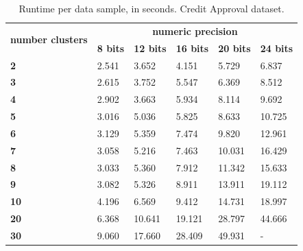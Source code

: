 \begin{table}[H]
\centering
\caption{Runtime per data sample, in seconds. Credit Approval dataset.}
\label{table:runtimeKMCA}
\begin{tabular}{|l|l|l|l|l|l|}
\hline
\multirow{2}{*}{\textbf{number clusters}} & \multicolumn{5}{c|}{\textbf{numeric precision}}                                              \\ \cline{2-6}
                                          & \textbf{8 bits} & \textbf{12 bits} & \textbf{16 bits} & \textbf{20 bits} & \textbf{24 bits} \\ \hline
\textbf{2}                                & 2.541           & 3.652            & 4.151            & 5.729            & 6.837            \\ \hline
\textbf{3}                                & 2.615           & 3.752            & 5.547            & 6.369            & 8.512            \\ \hline
\textbf{4}                                & 2.902           & 3.663            & 5.934            & 8.114            & 9.692            \\ \hline
\textbf{5}                                & 3.016           & 5.036            & 5.825            & 8.633            & 10.725           \\ \hline
\textbf{6}                                & 3.129           & 5.359            & 7.474            & 9.820            & 12.961           \\ \hline
\textbf{7}                                & 3.058           & 5.216            & 7.463            & 10.031           & 16.429           \\ \hline
\textbf{8}                                & 3.033           & 5.360            & 7.912            & 11.342           & 15.633           \\ \hline
\textbf{9}                                & 3.082           & 5.326            & 8.911            & 13.911           & 19.112           \\ \hline
\textbf{10}                               & 4.196           & 6.569            & 9.412            & 14.731           & 18.997           \\ \hline
\textbf{20}                               & 6.368           & 10.641           & 19.121           & 28.797           & 44.666           \\ \hline
\textbf{30}                               & 9.060           & 17.660           & 28.409           & 49.931           & -                \\ \hline

\end{tabular}
\end{table}
